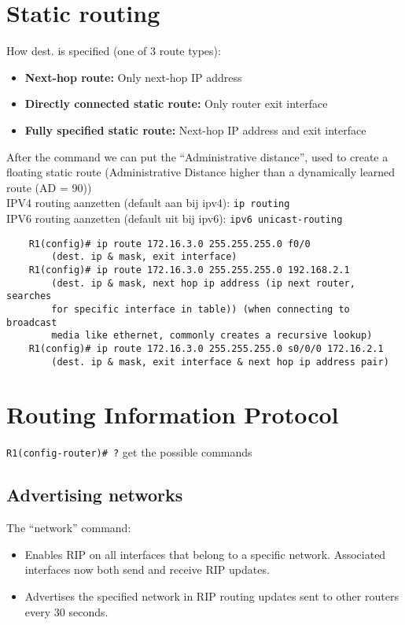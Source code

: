 \documentclass[10pt, a4paper]{article}
\begin{document}
	\section{Static routing}
	How dest. is specified (one of 3 route types):
	\begin{itemize}[noitemsep,nolistsep]
		\item \textbf{Next-hop route:} Only next-hop IP address
		\item \textbf{Directly connected static route:} Only router exit interface
		\item \textbf{Fully specified static route:} Next-hop IP address and exit interface\\
	\end{itemize}
	After the command we can put the ``Administrative distance'', used to create a floating static route (Administrative Distance higher than a dynamically learned route (AD = 90))\\
	IPV4 routing aanzetten (default aan bij ipv4): \texttt{ip routing}\\
	IPV6 routing aanzetten (default uit bij ipv6): \texttt{ipv6 unicast-routing}\\
	\begin{lstlisting}
	R1(config)# ip route 172.16.3.0 255.255.255.0 f0/0
		(dest. ip & mask, exit interface)
	R1(config)# ip route 172.16.3.0 255.255.255.0 192.168.2.1
		(dest. ip & mask, next hop ip address (ip next router, searches
		for specific interface in table)) (when connecting to broadcast
		media like ethernet, commonly creates a recursive lookup)
	R1(config)# ip route 172.16.3.0 255.255.255.0 s0/0/0 172.16.2.1
		(dest. ip & mask, exit interface & next hop ip address pair)
	\end{lstlisting}
	\newpage

	\section{Routing Information Protocol}
	\texttt{R1(config-router)\# ?} get the possible commands
	\subsection{Advertising networks}
	The ``network'' command:
	\begin{itemize}[noitemsep,nolistsep]
		\item Enables RIP on all interfaces that belong to a specific network. Associated interfaces now both send and receive RIP updates.
		\item Advertises the specified network in RIP routing updates sent to other routers every 30 seconds.\\
	\end{itemize}
\end{document}
